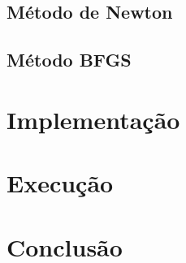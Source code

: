 \documentclass[a4paper,11pt]{article}
\begin{document}
        \subsection*{Método de Newton}
        \subsection*{Método BFGS}
    \section*{Implementação}
    \section*{Execução}
    \section*{Conclusão}
\end{document}
